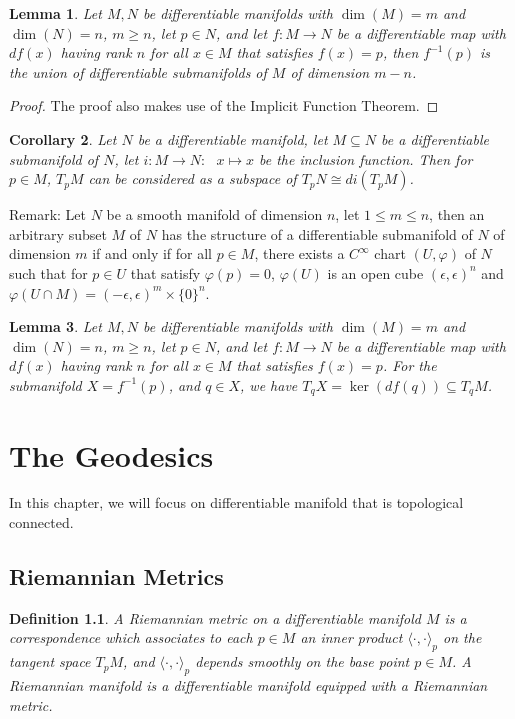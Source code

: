 \documentclass[11pt]{book}
\theoremstyle{break}
\theoremstyle{break}
\newtheorem{lem}{Lemma}[thm]
\newtheorem{corT}[lem]{Corollary}
\newtheorem{defn}{Definition}[corL]
\newcommand{\remark}{\color{blue}Remark: \color{black}}
\begin{document}
\begin{lem}
Let $M,N$ be differentiable manifolds with $\dim(M) = m$ and $\dim(N) = n$, $m\geq n$,  let $p \in N$, and let $f:M \to N$ be a differentiable map with $df(x)$ having rank $n$ for all $x \in M$ that satisfies $f(x) = p$, then $f^{-1}(p)$ is the union of differentiable submanifolds of $M$ of dimension $m-n$.  
\end{lem}
\begin{proof}
The proof also makes use of the Implicit Function Theorem. 
\end{proof}

\begin{corT}
Let $N$ be a differentiable manifold, let $M\subseteq N$ be a differentiable submanifold of $N$, let $i : M \to N:  \ \ \ x\mapsto x$ be the inclusion function. Then for $p \in M$, $T_pM$ can be considered as a subspace of $T_pN \cong di(T_pM)$.
\end{corT}


\remark Let $N$ be a smooth manifold of dimension $n$, let $1\leq m\leq n$, then an arbitrary subset $M$ of $N$ has the structure of a differentiable submanifold of $N$ of dimension $m$ if and only if for all $p \in M$, there exists a $C^\infty$ chart $(U,\varphi)$ of $N$ such that for $p \in U$ that satisfy $\varphi(p) = 0$, $\varphi(U)$ is an open cube $(\epsilon, \epsilon)^n$ and $\varphi(U \cap M) = (-\epsilon, \epsilon)^m \times \{0 \}^n$.


\begin{lem}
Let $M,N$ be differentiable manifolds with $\dim(M) = m$ and $\dim(N) = n$, $m\geq n$,  let $p \in N$, and let $f:M \to N$ be a differentiable map with $df(x)$ having rank $n$ for all $x \in M$ that satisfies $f(x) = p$. For the submanifold $X = f^{-1}(p)$, and $q \in X$, we have $T_q X = \ker(df(q)) \subseteq T_q M$. 
\end{lem}

  
  
\chapter{The Geodesics}
\setcounter{section}{3}
In this chapter, we will focus on differentiable manifold that is topological connected.
\section[Riemannian Metrics]{\color{red}Riemannian Metrics\color{black}}
\begin{defn}
A Riemannian metric on a differentiable manifold $M$ is a correspondence which associates to each $p \in M$ an inner product $\langle \cdot, \cdot\rangle_p$ on the tangent space $T_pM$, and $\langle \cdot,\cdot\rangle_p$ depends smoothly on the base point $p \in M$. A Riemannian manifold is a differentiable manifold equipped with a Riemannian metric.                                                                
\end{defn}
\end{document}
